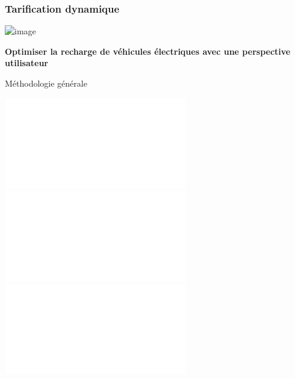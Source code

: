 \documentclass[french]{beamer}
\begin{document}
{\begin{frame}
\begin{columns}[T]
\begin{column}[T]{0.5\linewidth}  %
\begin{overlayarea}{0.95\linewidth}{2.8in}
\end{overlayarea}
\end{column}
\end{columns}
\end{frame}


\begin{frame}
\begin{center}
\frametitle{Tarification dynamique}
\includegraphics<1>[width=\linewidth]{hydroquebec.jpg}
\end{center}
\end{frame}

{
\begin{frame}
\begin{center}
\huge \textbf{Optimiser la recharge de véhicules électriques avec une perspective utilisateur}
\end{center}
\end{frame}
}
\addtocounter{framenumber}{-1}


\begin{frame}{Méthodologie générale}
\begin{center}
\begin{overlayarea}{\linewidth}{2.8in}
\includegraphics<1 | handout:0>[width=0.9\linewidth]{FigGralMeth01.pdf}
\includegraphics<2 | handout:0>[width=0.9\linewidth]{FigGralMeth02.pdf}
\includegraphics<3>[width=0.9\linewidth]{FigGralMeth03.pdf}
\end{overlayarea}
\end{center}
\end{frame}

}
\end{document}
